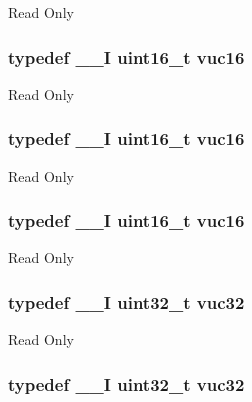 Read Only \hypertarget{group___exported__types_ga7f6037565f0caa27727c8b871daf0d56}{
\subsubsection[{vuc16}]{\setlength{\rightskip}{0pt plus 5cm}typedef {\bf \-\_\-\-\_\-\-I} uint16\-\_\-t {\bf vuc16}}}\label{group___exported__types_ga7f6037565f0caa27727c8b871daf0d56}
Read Only \hypertarget{group___exported__types_ga7f6037565f0caa27727c8b871daf0d56}{
\subsubsection[{vuc16}]{\setlength{\rightskip}{0pt plus 5cm}typedef {\bf \-\_\-\-\_\-\-I} uint16\-\_\-t {\bf vuc16}}}\label{group___exported__types_ga7f6037565f0caa27727c8b871daf0d56}
Read Only \hypertarget{group___exported__types_ga7f6037565f0caa27727c8b871daf0d56}{
\subsubsection[{vuc16}]{\setlength{\rightskip}{0pt plus 5cm}typedef {\bf \-\_\-\-\_\-\-I} uint16\-\_\-t {\bf vuc16}}}\label{group___exported__types_ga7f6037565f0caa27727c8b871daf0d56}
Read Only \hypertarget{group___exported__types_ga2e08e321a35a55e72c5b3a507e76371f}{
\subsubsection[{vuc32}]{\setlength{\rightskip}{0pt plus 5cm}typedef {\bf \-\_\-\-\_\-\-I} uint32\-\_\-t {\bf vuc32}}}\label{group___exported__types_ga2e08e321a35a55e72c5b3a507e76371f}
Read Only \hypertarget{group___exported__types_ga2e08e321a35a55e72c5b3a507e76371f}{
\subsubsection[{vuc32}]{\setlength{\rightskip}{0pt plus 5cm}typedef {\bf \-\_\-\-\_\-\-I} uint32\-\_\-t {\bf vuc32}}}\label{group___exported__types_ga2e08e321a35a55e72c5b3a507e76371f}
